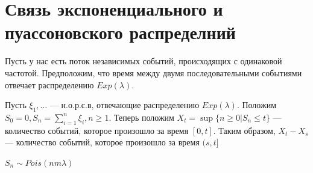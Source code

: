 



\section{Связь экспоненциального и пуассоновского распределний}
Пусть у нас есть поток независимых событий, происходящих с одинаковой частотой. Предположим, что время между двумя последовательными событиями отвечает распределению \(Exp(\lambda)\).

Пусть \(\xi_1, \dots \) --- н.о.р.с.в, отвечающие распределению \(Exp(\lambda)\). Положим \(S_0 = 0, S_n = \sum_{i = 1}^n \xi_i, n \ge 1\). Теперь положим \(X_t = \sup\{n \ge 0 | S_n \le t\}\) --- количество событий, которое произошло за время \([0, t]\). Таким образом, \(X_t - X_s\) --- количество событий, которое произошло за время \((s, t]\)

\begin{lemma}[б/д]
    \(S_n \sim Pois(nm \lambda)\)
\end{lemma}

